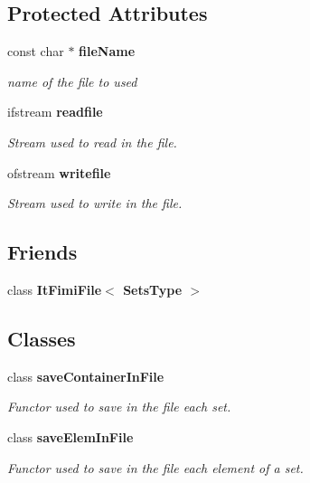 \subsection*{Protected Attributes}
\begin{CompactItemize}
\item 
const char $\ast$ {\bf file\-Name}\label{class_fimi_file_798e7dd3a0fb30f74d14d371b380329d}

\begin{CompactList}\small\item\em name of the file to used \item\end{CompactList}\item 
ifstream {\bf readfile}\label{class_fimi_file_6e6ce86565764314471aaf478639fd2c}

\begin{CompactList}\small\item\em Stream used to read in the file. \item\end{CompactList}\item 
ofstream {\bf writefile}\label{class_fimi_file_c3caf86aea00e29476a21d1285fd7c77}

\begin{CompactList}\small\item\em Stream used to write in the file. \item\end{CompactList}\end{CompactItemize}
\subsection*{Friends}
\begin{CompactItemize}
\item 
class {\bf It\-Fimi\-File$<$ Sets\-Type $>$}\label{class_fimi_file_8a239185a8893ca8f127ab8909bb9ee7}

\end{CompactItemize}
\subsection*{Classes}
\begin{CompactItemize}
\item 
class {\bf save\-Container\-In\-File}
\begin{CompactList}\small\item\em Functor used to save in the file each set. \item\end{CompactList}\item 
class {\bf save\-Elem\-In\-File}
\begin{CompactList}\small\item\em Functor used to save in the file each element of a set. \item\end{CompactList}\end{CompactItemize}


